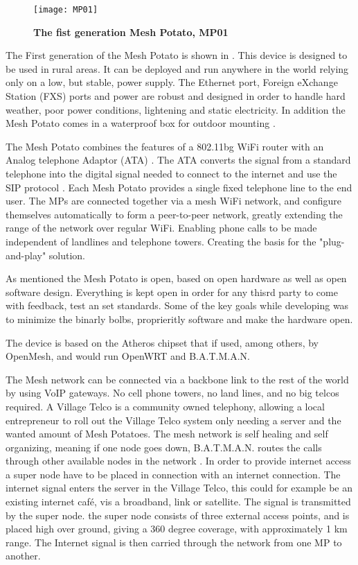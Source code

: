 \begin{figure}[h!]

  \centering
      \texttt{[image: MP01]}
  \caption [The Mesh Potato]{\textbf{The fist generation Mesh Potato, MP01}}
  \label{fig:MP01}
\end{figure}

The First generation of the Mesh Potato is shown in . This device is designed to be used in rural areas. It can be deployed and run anywhere in the world relying only on a low, but stable, power supply. The Ethernet port, Foreign eXchange Station (FXS) ports and power are robust and designed in order to handle hard weather, poor power conditions, lightening and static electricity. In addition the Mesh Potato comes in a waterproof box for outdoor mounting \cite{background}.

The Mesh Potato combines the features of a 802.11bg WiFi router with an Analog telephone Adaptor (ATA) \cite{MP}. The ATA converts the signal from a standard telephone into the digital signal needed to connect to the internet and use the SIP protocol \cite{MParticle}. 
Each Mesh Potato provides a single fixed telephone line to the end user. The MPs are connected together via a mesh WiFi network, and configure themselves automatically to form a peer-to-peer network, greatly extending the range of the network over regular WiFi. Enabling phone calls to be made independent of landlines and telephone towers. Creating the basis for the "plug-and-play" solution. 

As mentioned the Mesh Potato is open, based on open hardware as well as open software design. Everything is kept open in order for any thisrd party to come with feedback, test an set standards. Some of the key goals while developing was to minimize the binarly bolbs, proprieritly software and make the hardware open. 

The device is based on the Atheros chipset that if used, among others, by OpenMesh, and would run OpenWRT and B.A.T.M.A.N.



The Mesh network can be connected via a backbone link to the rest of the world by using VoIP gateways. No cell phone towers, no land lines, and no big telcos required. A Village Telco is a community owned telephony, allowing a local entrepreneur to roll out the Village Telco system only needing a server and the wanted amount of Mesh Potatoes. The mesh network is self healing and self organizing, meaning if one node goes down, B.A.T.M.A.N. routes the calls through other available nodes in the network \cite{MPbyRowe}. In order to provide internet access a super node have to be placed in connection with an internet connection. The internet signal enters the server in the Village Telco, this could for example be an existing internet café, vis a broadband, link or satellite. The signal is transmitted by the super node. the super node consists of three external access points, and is placed high over ground, giving a 360 degree coverage, with approximately 1 km range. The Internet signal is then carried through the network from one MP to another. 


